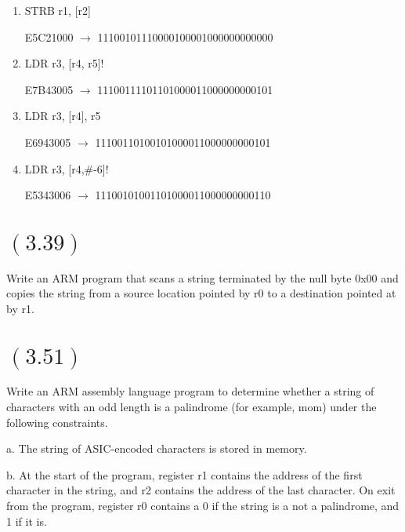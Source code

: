 \documentclass[letterpaper,12pt,titlepage]{article}
\begin{document}
\renewcommand{\labelenumi}{\alph{enumi})}
\begin{enumerate}

\item STRB r1, [r2]

\begin{mdframed}[style=MyFrame]
E5C21000 $\rightarrow$ 11100101110000100001000000000000
\end{mdframed}

\item LDR r3, [r4, r5]!

\begin{mdframed}[style=MyFrame]
E7B43005 $\rightarrow$ 11100111101101000011000000000101
\end{mdframed}

\item LDR r3, [r4], r5

\begin{mdframed}[style=MyFrame]
E6943005 $\rightarrow$ 11100110100101000011000000000101
\end{mdframed}

\item LDR r3, [r4,\#-6]! 

\begin{mdframed}[style=MyFrame]
E5343006 $\rightarrow$ 11100101001101000011000000000110
\end{mdframed}

\end{enumerate}

\newpage
\section*{$(3.39)$} Write an ARM program that scans a string terminated by the null byte 0x00 and copies the string from a source location pointed by r0 to a destination pointed at by r1.


\newpage
\section*{$(3.51)$} Write an ARM assembly language program to determine whether a string of characters with an odd length is a palindrome (for example, mom) under the following constraints.

a. The string of ASIC-encoded characters is stored in memory.

b. At the start of the program, register r1 contains the address of the first character in the string, and r2 contains the address of the last character. On exit from the program, register r0 contains a 0 if the string is a not a palindrome, and 1 if it is. \newline






\end{document}
